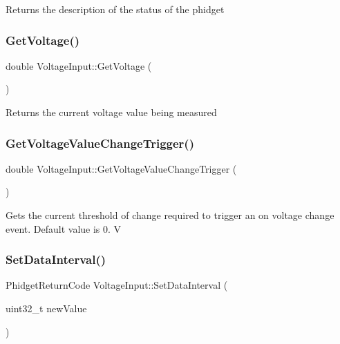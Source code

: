 Returns the description of the status of the phidget\mbox{\label{classVoltageInput_aaf13f9533502dd4de4a9ac1de6293f3f}} 
\subsubsection{\texorpdfstring{Get\+Voltage()}{GetVoltage()}}
{\footnotesize\ttfamily double Voltage\+Input\+::\+Get\+Voltage (\begin{DoxyParamCaption}{ }\end{DoxyParamCaption})\hspace{0.3cm}{\ttfamily [inline]}}

Returns the current voltage value being measured\mbox{\label{classVoltageInput_a7a54ecf272a33b2eaea82e455eaeb13f}} 
\subsubsection{\texorpdfstring{Get\+Voltage\+Value\+Change\+Trigger()}{GetVoltageValueChangeTrigger()}}
{\footnotesize\ttfamily double Voltage\+Input\+::\+Get\+Voltage\+Value\+Change\+Trigger (\begin{DoxyParamCaption}{ }\end{DoxyParamCaption})\hspace{0.3cm}{\ttfamily [inline]}}

Gets the current threshold of change required to trigger an on voltage change event. Default value is 0. V\mbox{\label{classVoltageInput_a9065d8ae934ac67142d49c731533965d}} 
\subsubsection{\texorpdfstring{Set\+Data\+Interval()}{SetDataInterval()}}
{\footnotesize\ttfamily Phidget\+Return\+Code Voltage\+Input\+::\+Set\+Data\+Interval (\begin{DoxyParamCaption}\item[{uint32\+\_\+t}]{new\+Value }\end{DoxyParamCaption})\hspace{0.3cm}{\ttfamily [inline]}}

